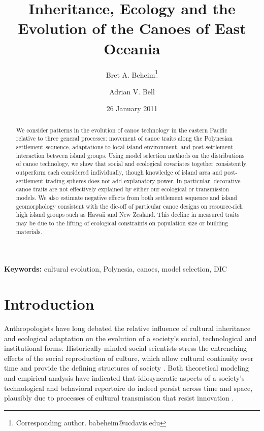 \documentclass[11pt]{article}
\title{Inheritance, Ecology and the Evolution of the Canoes of East Oceania}
\author[,    1]{Bret A. Beheim\footnote{Corresponding author. babeheim@ucdavis.edu}}
\author[1]{Adrian V. Bell}
\affil[1]{Graduate Group in Ecology, Department of Environmental Science and Policy, University of California, Davis, USA}
\date{26 January 2011}
\begin{document}
\setlength{\parindent}{30pt}

\maketitle

\begin{center}
{\bf Keywords:} cultural evolution, Polynesia, canoes, model selection, DIC
\end{center}

\begin{abstract}
We consider patterns in the evolution of canoe technology in the eastern Pacific relative to three general processes: movement of canoe traits along the Polynesian settlement sequence, adaptations to local island environment, and post-settlement interaction between island groups. Using model selection methods on the distributions of canoe technology, we show that social and ecological covariates together consistently outperform each considered individually, though knowledge of island area and post-settlement trading spheres does not add explanatory power. In particular, decorative canoe traits are not effectively explained by either our ecological or transmission models. We also estimate negative effects from both settlement sequence and island geomorphology consistent with the die-off of particular canoe designs on resource-rich high island groups such as Hawaii and New Zealand. This decline in measured traits may be due to the lifting of ecological constraints on population size or building materials.
\end{abstract}

\section{Introduction}

Anthropologists have long debated the relative influence of cultural inheritance and ecological adaptation on the evolution of a society's social, technological and institutional forms. Historically-minded social scientists stress the entrenching effects of the social reproduction of culture, which allow cultural continuity over time and provide the defining structures of society \citep{Gaddis2002, wimsatt2007reproducing}. Both theoretical modeling and empirical analysis have indicated that idiosyncratic aspects of a society's technological and behavioral repertoire do indeed persist across time and space, plausibly due to processes of cultural transmission that resist innovation \citep{Edgerton1971,Guglielmino1995, Nisbett1996, Richerson2005, eerkens2017cultural, Temkin2007:CulturePhylogenetics}.
\end{document}
